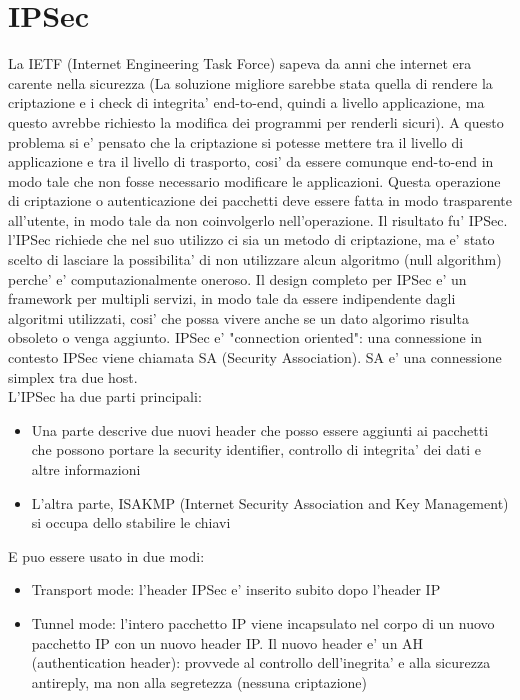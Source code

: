 \section{IPSec}
La IETF (Internet Engineering Task Force) sapeva da anni che internet era carente nella sicurezza (La soluzione migliore sarebbe stata quella di rendere la criptazione e i check di integrita' end-to-end, quindi a livello applicazione, ma questo avrebbe richiesto la modifica dei programmi per renderli sicuri). A questo problema si e' pensato che la criptazione si potesse mettere tra il livello di applicazione e tra il livello di trasporto, cosi' da essere comunque end-to-end in modo tale che non fosse necessario modificare le applicazioni. Questa operazione di criptazione o autenticazione dei pacchetti deve essere fatta in modo trasparente all'utente, in modo tale da non coinvolgerlo nell'operazione. 
Il risultato fu' IPSec. l'IPSec richiede che nel suo utilizzo ci sia un metodo di criptazione, ma e' stato scelto di lasciare la possibilita' di non utilizzare alcun algoritmo (null algorithm) perche' e' computazionalmente oneroso. Il design completo per IPSec e' un framework per multipli servizi, in  modo tale da essere indipendente dagli algoritmi utilizzati, cosi' che possa vivere anche se un dato algorimo risulta obsoleto o venga aggiunto. IPSec e' "connection oriented": una connessione in contesto IPSec viene chiamata SA (Security Association). SA e' una connessione simplex tra due host.\\ L'IPSec ha due parti principali:
\begin{itemize}
	\item Una parte descrive due nuovi header che posso essere aggiunti ai pacchetti che possono portare la security identifier, controllo di integrita' dei dati e altre informazioni
	\item L'altra parte, ISAKMP (Internet Security Association and Key Management) si occupa dello stabilire le chiavi
\end{itemize}
E puo essere usato in due modi:
\begin{itemize}
	\item Transport mode: l'header IPSec e' inserito subito dopo l'header IP
	\item Tunnel mode: l'intero pacchetto IP viene incapsulato nel corpo di un nuovo pacchetto IP con un nuovo header IP. Il nuovo header e' un AH (authentication header): provvede al controllo dell'inegrita' e alla sicurezza antireply, ma non alla segretezza (nessuna criptazione)
\end{itemize}
